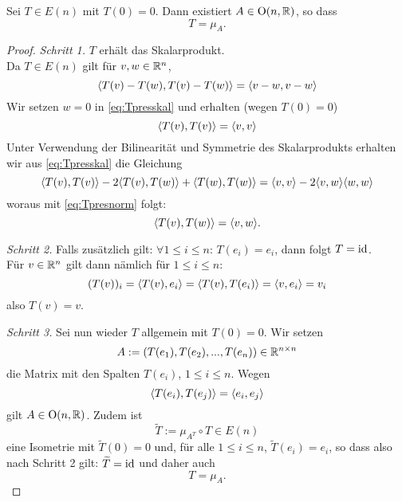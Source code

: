 \documentclass{book}
\begin{document}
\begin{thm}
    \label{thm:klassifikation}
    Sei $T \in E(n)$ mit $T(0) = 0$. Dann existiert $A \in \operatorname{O}(n,\mathbb{R})$, so dass
    \[
        T = \mu_A.
    \]
\end{thm}
\begin{proof}
    \noindent
    \emph{Schritt 1.} $T$ erhält das Skalarprodukt.\\

    Da $T \in E(n)$ gilt für $v,w \in \mathbb{R}^n$, 
    \begin{equation}
        \label{eq:Tpresskal}
        \langle T(v) - T(w), T(v) - T(w) \rangle = \langle v-w,v-w \rangle
    \end{equation}
    Wir setzen  $w = 0$ in \eqref{eq:Tpresskal} und erhalten (wegen $T(0) = 0$)
    \begin{equation}
        \label{eq:Tpresnorm}
        \langle T(v),T(v) \rangle = \langle v,v \rangle
    \end{equation}
    Unter Verwendung der Bilinearität und Symmetrie des Skalarprodukts erhalten wir aus \eqref{eq:Tpresskal} die Gleichung
    \[
        \langle T(v),T(v) \rangle
        -2\langle T(v),T(w) \rangle
        +\langle T(w),T(w) \rangle
        =
        \langle v,v \rangle
        -2\langle v,w \rangle
        \langle w,w \rangle
    \]
    woraus mit \eqref{eq:Tpresnorm} folgt:
    \begin{equation}
        \label{eq:Tpressk}
        \langle T(v), T(w) \rangle = \langle v,w \rangle.
    \end{equation}

    \noindent
    \emph{Schritt 2.} Falls zusätzlich gilt: $\forall 1 \le i \le n$: $T(e_i) = e_i$, dann folgt $T = \operatorname{id}$.\\

    Für $v \in \mathbb{R}^n$ gilt dann nämlich für $1 \le i \le n$: 
    \[
        (T(v))_i = \langle T(v), e_i \rangle = \langle T(v),T(e_i) \rangle = \langle v,e_i \rangle = v_i
    \]
    also $T(v) = v$. 

    \noindent
    \emph{Schritt 3.} Sei nun wieder $T$ allgemein mit $T(0) = 0$. Wir setzen 
    \[
        A := \left(T(e_1), T(e_2), ..., T(e_n)\right) \in \mathbb{R}^{n \times n}
    \]
    die Matrix mit den Spalten $T(e_i)$, $1 \le i \le n$. Wegen
    \[
        \langle T(e_i),T(e_j) \rangle = \langle e_i,e_j \rangle
    \]
    gilt $A \in \operatorname{O}(n,\mathbb{R})$. Zudem ist 
    \[
        \widetilde{T} := \mu_{A^T} \circ T \in E(n)
    \]
    eine Isometrie mit $\widetilde{T}(0) = 0$ und, für alle $1 \le i \le n$,
    $\widetilde{T}(e_i) = e_i$, so dass also nach Schritt 2 gilt: $\widetilde{T} =
    \operatorname{id}$ und daher auch
    \[
        T = \mu_A.
    \]
\end{proof}
\end{document}
